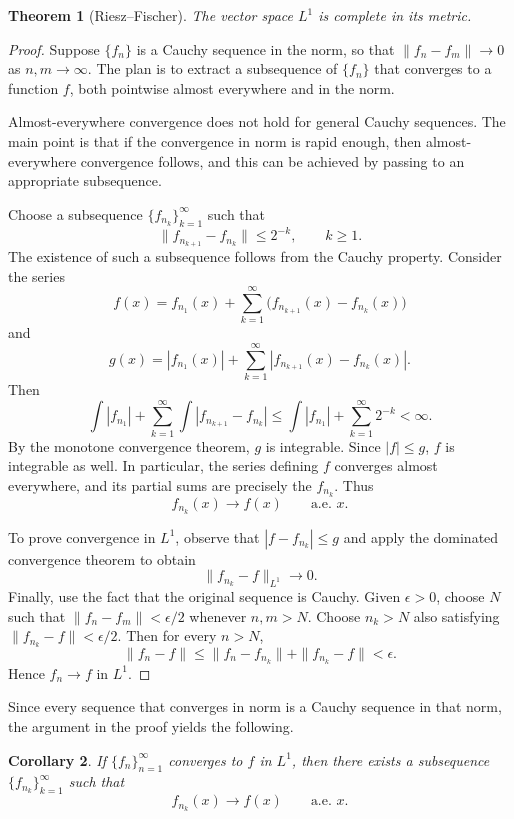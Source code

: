 \documentclass[11pt,openany]{book}
\newtheorem{theorem}{Theorem}[section]
\newtheorem{corollary}[theorem]{Corollary}
\begin{document}
\begin{theorem}[Riesz--Fischer]
The vector space $L^1$ is complete in its metric.
\end{theorem}

\begin{proof}
Suppose $\{f_n\}$ is a Cauchy sequence in the norm, so that $\|f_n-f_m\|\to0$ as $n,m\to\infty$. The plan is to extract a subsequence of $\{f_n\}$ that converges to a function $f$, both pointwise almost everywhere and in the norm.

Almost-everywhere convergence does not hold for general Cauchy sequences. The main point is that if the convergence in norm is rapid enough, then almost-everywhere convergence follows, and this can be achieved by passing to an appropriate subsequence.

Choose a subsequence $\{f_{n_k}\}_{k=1}^{\infty}$ such that
\[
\|f_{n_{k+1}}-f_{n_k}\|\leq2^{-k},
\qquad k\geq1.
\]
The existence of such a subsequence follows from the Cauchy property. Consider the series
\[
f(x)=f_{n_1}(x)+\sum_{k=1}^{\infty}\bigl(f_{n_{k+1}}(x)-f_{n_k}(x)\bigr)
\]
and
\[
g(x)=|f_{n_1}(x)|+\sum_{k=1}^{\infty}|f_{n_{k+1}}(x)-f_{n_k}(x)|.
\]
Then
\[
\int|f_{n_1}|+\sum_{k=1}^{\infty}\int|f_{n_{k+1}}-f_{n_k}|
\leq\int|f_{n_1}|+\sum_{k=1}^{\infty}2^{-k}<\infty.
\]
By the monotone convergence theorem, $g$ is integrable. Since $|f|\leq g$, $f$ is integrable as well. In particular, the series defining $f$ converges almost everywhere, and its partial sums are precisely the $f_{n_k}$. Thus
\[
f_{n_k}(x)\to f(x)\qquad\text{a.e. }x.
\]

To prove convergence in $L^1$, observe that $|f-f_{n_k}|\leq g$ and apply the dominated convergence theorem to obtain
\[
\|f_{n_k}-f\|_{L^1}\to0.
\]
Finally, use the fact that the original sequence is Cauchy. Given $\epsilon>0$, choose $N$ such that $\|f_n-f_m\|<\epsilon/2$ whenever $n,m>N$. Choose $n_k>N$ also satisfying $\|f_{n_k}-f\|<\epsilon/2$. Then for every $n>N$,
\[
\|f_n-f\|\leq\|f_n-f_{n_k}\|+\|f_{n_k}-f\|<\epsilon.
\]
Hence $f_n\to f$ in $L^1$.
\end{proof}

Since every sequence that converges in norm is a Cauchy sequence in that norm, the argument in the proof yields the following.

\begin{corollary}
If $\{f_n\}_{n=1}^{\infty}$ converges to $f$ in $L^1$, then there exists a subsequence $\{f_{n_k}\}_{k=1}^{\infty}$ such that
\[
f_{n_k}(x)\to f(x)\qquad\text{a.e. }x.
\]
\end{corollary}
\end{document}
